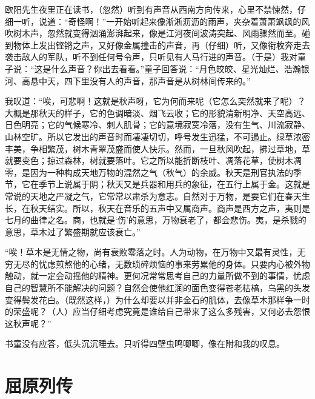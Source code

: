 \documentclass[12pt,UTF-8,openany,a4]{ctexbook}
\begin{document}
\begin{large}\yiwen
    
    欧阳先生夜里正在读书，（忽然）听到有声音从西南方向传来，心里不禁悚然，仔细一听，说道：“奇怪啊！”一开始听起来像淅淅沥沥的雨声，夹杂着萧萧飒飒的风吹树木声，忽然就变得汹涌澎湃起来，像是江河夜间波涛突起、风雨骤然而至。碰到物体上发出铿锵之声，又好像金属撞击的声音，再（仔细）听，又像衔枚奔走去袭击敌人的军队，听不到任何号令声，只听见有人马行进的声音。（于是）我对童子说：“这是什么声音？你出去看看。”童子回答说：“月色皎皎、星光灿烂、浩瀚银河、高悬中天，四下里没有人的声音，那声音是从树林间传来的。”
    
    我叹道：“唉，可悲啊！这就是秋声呀，它为何而来呢（它怎么突然就来了呢）？大概是那秋天的样子，它的色调暗淡、烟飞云收；它的形貌清新明净、天空高远、日色明亮；它的气候寒冷、刺人肌骨；它的意境寂寞冷落，没有生气、川流寂静、山林空旷。所以它发出的声音时而凄凄切切，呼号发生迅猛，不可遏止。绿草浓密丰美，争相繁茂，树木青翠茂盛而使人快乐。然而，一旦秋风吹起，拂过草地，草就要变色；掠过森林，树就要落叶。它之所以能折断枝叶、凋落花草，使树木凋零，是因为一种构成天地万物的混然之气（秋气）的余威。秋天是刑官执法的季节，它在季节上说属于阴；秋天又是兵器和用兵的象征，在五行上属于金。这就是常说的天地之严凝之气，它常常以肃杀为意志。自然对于万物，是要它们在春天生长，在秋天结实。所以，秋天在音乐的五声中又属商声。商声是西方之声，夷则是七月的曲律之名。商，也就是‘伤’的意思，万物衰老了，都会悲伤。夷，是杀戮的意思，草木过了繁盛期就应该衰亡。”
    
    “唉！草木是无情之物，尚有衰败零落之时。人为动物，在万物中又最有灵性，无穷无尽的忧虑煎熬他的心绪，无数琐碎烦恼的事来劳累他的身体。只要内心被外物触动，就一定会动摇他的精神。更何况常常思考自己的力量所做不到的事情，忧虑自己的智慧所不能解决的问题？自然会使他红润的面色变得苍老枯槁，乌黑的头发变得鬓发花白。（既然这样，）为什么却要以并非金石的肌体，去像草木那样争一时的荣盛呢？（人）应当仔细考虑究竟是谁给自己带来了这么多残害，又何必去怨恨这秋声呢？”
    
    书童没有应答，低头沉沉睡去。只听得四壁虫鸣唧唧，像在附和我的叹息。
    

\end{large}



\chapter{屈原列传}
\end{document}
